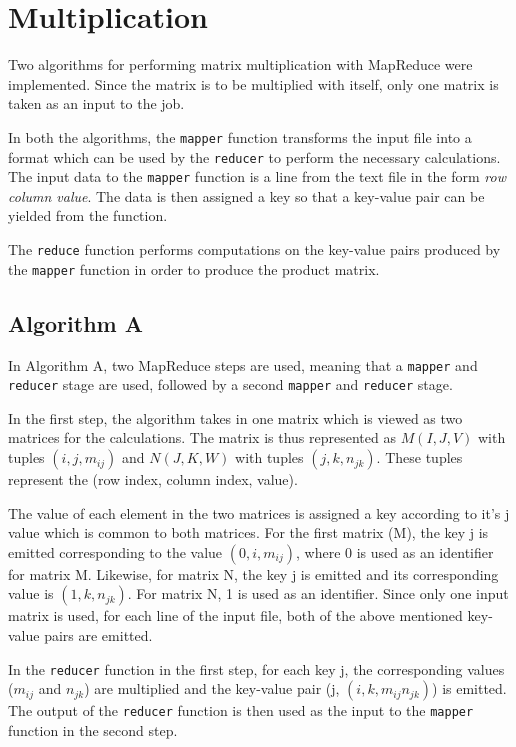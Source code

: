 \documentclass[10pt,twocolumn]{witseiepaper}
\begin{document}
\section{Multiplication}
Two algorithms for performing matrix multiplication with MapReduce were implemented. Since the matrix is to be multiplied with itself, only one matrix is taken as an input to the job.

In both the algorithms, the \texttt{mapper} function transforms the input file into a format which can be used by the \texttt{reducer} to perform the necessary calculations. The input data to the \texttt{mapper} function is a line from the text file in the form \textit{row column value}. The data is then assigned a key so that a key-value pair can be yielded from the function.

The \texttt{reduce} function performs computations on the key-value pairs produced by the \texttt{mapper} function in order to produce the product matrix.

\subsection{Algorithm A} \label{algA}
In Algorithm A, two MapReduce steps are used, meaning that a \texttt{mapper} and \texttt{reducer} stage are used, followed by a second \texttt{mapper} and \texttt{reducer} stage.

In the first step, the algorithm takes in one matrix which is viewed as two matrices for the calculations. The matrix is thus represented as $M(I, J, V)$ with tuples $(i, j, m_{ij})$ and $N(J, K, W)$ with tuples $(j, k, n_{jk})$. These tuples represent the (row index, column index, value).

The value of each element in the two matrices is assigned a key according to it's j value which is common to both matrices. For the first matrix (M), the key j is emitted corresponding to the value $(0, i, m_{ij})$, where 0 is used as an identifier for matrix M. Likewise, for matrix N, the key j is emitted and its corresponding value is $(1, k, n_{jk})$. For matrix N, 1 is used as an identifier. Since only one input matrix is used, for each line of the input file, both of the above mentioned key-value pairs are emitted.

In the \texttt{reducer} function in the first step, for each key j, the corresponding values ($m_{ij}$ and $n_{jk}$) are multiplied and the key-value pair (j, $(i, k, m_{ij}n_{jk})$) is emitted. The output of the \texttt{reducer} function is then used as the input to the \texttt{mapper} function in the second step.
\end{document}
